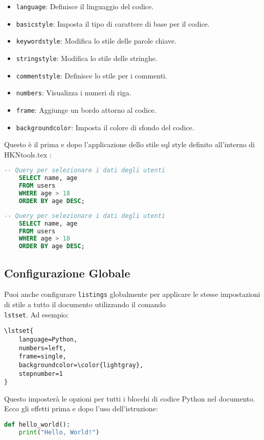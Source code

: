 \begin{itemize}
	\item \texttt{language}: Definisce il linguaggio del codice.
	\item \texttt{basicstyle}: Imposta il tipo di carattere di base per il codice.
	\item \texttt{keywordstyle}: Modifica lo stile delle parole chiave.
	\item \texttt{stringstyle}: Modifica lo stile delle stringhe.
	\item \texttt{commentstyle}: Definisce lo stile per i commenti.
	\item \texttt{numbers}: Visualizza i numeri di riga.
	\item \texttt{frame}: Aggiunge un bordo attorno al codice.
	\item \texttt{backgroundcolor}: Imposta il colore di sfondo del codice.
\end{itemize}

Questo è il prima e dopo l'applicazione dello stile sql style definito all'interno di HKNtools.tex :
\begin{lstlisting}[language=SQL]
	-- Query per selezionare i dati degli utenti
	SELECT name, age
	FROM users
	WHERE age > 18
	ORDER BY age DESC;
\end{lstlisting}

\begin{lstlisting}[language=SQL, style=hkn]
	-- Query per selezionare i dati degli utenti
	SELECT name, age
	FROM users
	WHERE age > 18
	ORDER BY age DESC;
\end{lstlisting}

\subsection{Configurazione Globale}
Puoi anche configurare \texttt{listings} globalmente per applicare le stesse impostazioni di stile a tutto il documento utilizzando il comando \texttt{\\lstset}. Ad esempio:

\begin{lstlisting}
\lstset{
	language=Python,
	numbers=left,
	frame=single,
	backgroundcolor=\color{lightgray},
	stepnumber=1
}
\end{lstlisting}

Questo imposterà le opzioni per tutti i blocchi di codice Python nel documento.
Ecco gli effetti prima e dopo l'uso dell'istruzione:

\begin{lstlisting}[language=Python]
	def hello_world():
	print("Hello, World!")
\end{lstlisting}

